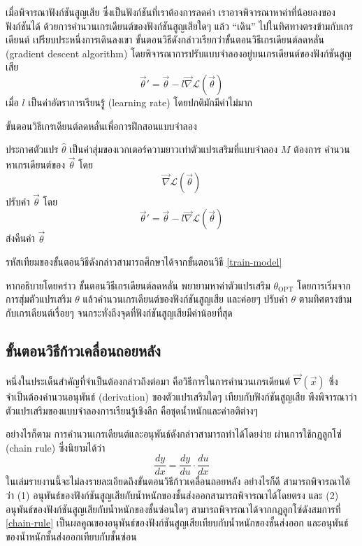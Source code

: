 เมื่อพิจารณาฟังก์ชันสูญเสีย ซึ่งเป็นฟังก์ชันที่เราต้องการลดค่า เราอาจพิจารณาหาค่าที่น้อยลงของฟังก์ชันได้ ด้วยการคำนวนเกรเดียนต์ของฟังก์ชันสูญเสียใดๆ แล้ว ``เดิน''  ไปในทิศทางตรงข้ามกับเกรเดียนต์ เปรียบประหนึ่งการเดินลงเขา ขั้นตอนวิธีดังกล่าวเรียกว่าขั้นตอนวิธีเกรเดียนต์ลดหลั่น (gradient descent algorithm) โดยพิจารณาการปรับแบบจำลองอยู่บนเกรเดียนต์ของฟังก์ชันสูญเสีย
\begin{equation}
    \vec{\theta}' = \vec{\theta} - l \vec{\nabla}{\mathscr{L}(\vec{\theta})}
    \label{gradient-descent}
\end{equation}
เมื่อ $l$ เป็นค่าอัตราการเรียนรู้ (learning rate) โดยปกติมักมีค่าไม่มาก

\begin{algorithm} 
    \caption{ขั้นตอนวิธีเกรเดียนต์ลดหลั่นเพื่อการฝึกสอนแบบจำลอง}
    \label{train-model}
    \begin{algorithmic}
        \STATE ประกาศตัวแปร $\hat{\theta}$ เป็นค่าสุ่มของเวกเตอร์ความยาวเท่าตัวแปรเสริมที่แบบจำลอง $M$ ต้องการ
            \STATE คำนวนหาเกรเดียนต์ของ $\vec{\theta}$ โดย 
            $$
                \vec{\nabla}{\mathscr{L}(\vec{\theta})}
            $$
            \STATE ปรับค่า $\vec{\theta}$ โดย
            $$
                \vec{\theta}' = \vec{\theta} - l \vec{\nabla}{\mathscr{L}(\vec{\theta})}
            $$
        \ENDFOR
        \STATE ส่งคืนค่า $\vec{\theta}$
    \end{algorithmic}
\end{algorithm}

รหัสเทียมของขั้นตอนวิธีดังกล่าวสามารถศึกษาได้จากขั้นตอนวิธี \ref{train-model}

หากอธิบายโดยคร่าว ขั้นตอนวิธีเกรเดียนต์ลดหลั่น พยายามหาค่าตัวแปรเสริม $\theta_{\textrm{OPT}}$ โดยการเริ่มจากการสุ่มตัวแปรเสริม $\theta$ แล้วคำนวนเกรเดียนต์ของฟังก์ชันสูญเสีย และค่อยๆ ปรับค่า $\theta$ ตามทิศตรงข้ามกับเกรเดียนต์เรื่อยๆ จนกระทั่งถึงจุดที่ฟังก์ชันสูญเสียมีค่าน้อยที่สุด

\subsection{ขั้นตอนวิธีก้าวเคลื่อนถอยหลัง}

หนึ่งในประเด็นสำคัญที่จำเป็นต้องกล่าวถึงต่อมา คือวิธีการในการคำนวนเกรเดียนต์ $\vec{\nabla}(\vec{x})$ ซึ่งจำเป็นต้องคำนวนอนุพันธ์ (derivation) ของตัวแปรเสริมใดๆ เทียบกับฟังก์ชันสูญเสีย พึงพิจารณาว่าตัวแปรเสริมของแบบจำลองการเรียนรู้เชิงลึก คือชุดน้ำหนักและค่าอติต่างๆ

อย่างไรก็ตาม การคำนวนเกรเดียนต์และอนุพันธ์ดังกล่าวสามารถทำได้โดยง่าย ผ่านการใช้กฎลูกโซ่ (chain rule) ซึ่งนิยามได้ว่า
\begin{equation}
    \frac{dy}{dx} = \frac{dy}{du} \cdot \frac{du}{dx}
    \label{chain-rule}
\end{equation}
ในเล่มรายงานนี้จะไม่ลงรายละเอียดถึงขั้นตอนวิธีก้าวเคลื่อนถอยหลัง อย่างไรก็ดี สามารถพิจารณาได้ว่า (1) อนุพันธ์ของฟังก์ชันสูญเสียกับน้ำหนักของชั้นส่งออกสามารถพิจารณาได้โดยตรง และ (2) อนุพันธ์ของฟังก์ชันสูญเสียกับน้ำหนักของชั้นซ่อนใดๆ สามารถพิจารณาได้จากกฎลูกโซ่ดังสมการที่ \ref{chain-rule} เป็นผลคูณของอนุพันธ์ของฟังก์ชันสูญเสียเทียบกับน้ำหนักของชั้นส่งออก และอนุพันธ์ของน้ำหนักชั้นส่งออกเทียบกับชั้นซ่อน

